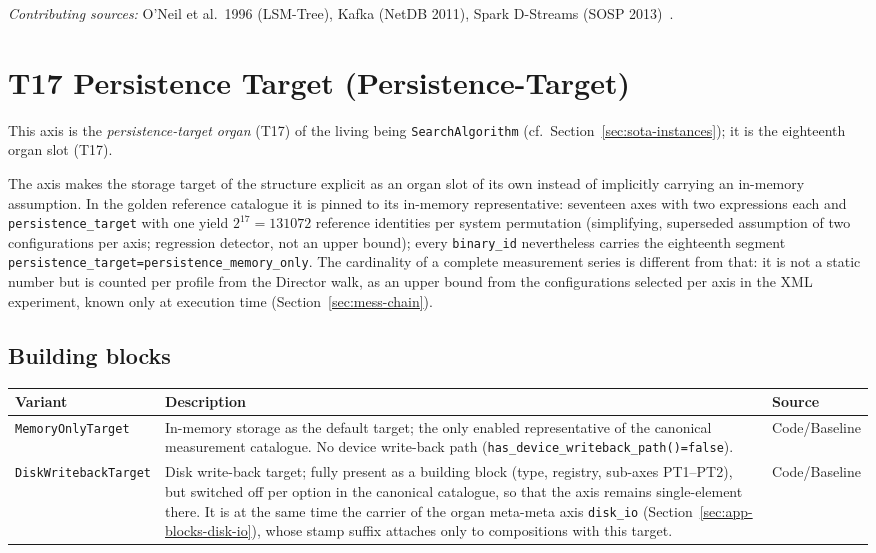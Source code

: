 \emph{Contributing sources:} O'Neil et al.\ 1996 (LSM-Tree), Kafka (Net\allowbreak{}DB 2011), Spark D-Streams (SOSP 2013)~\cite{oneil1996lsm,kreps2011kafka,zaharia2013dstreams}.

\section{T17 Persistence Target (Persistence-Target)}

This axis is the \emph{persistence-target organ} (T17) of the living being \texttt{SearchAlgorithm} (cf.\ Section~\ref{sec:sota-instances}); it is the eighteenth organ slot (T17).

The axis makes the storage target of the structure explicit as an organ slot of its own instead of implicitly carrying an in-memory assumption. In the golden reference catalogue it is pinned to its in-memory representative: seventeen axes with two expressions each and \texttt{persistence\_\allowbreak{}target} with one yield $2^{17} = 131072$ reference identities per system permutation (simplifying, superseded assumption of two configurations per axis; regression detector, not an upper bound); every \texttt{binary\_\allowbreak{}id} nevertheless carries the eighteenth segment \texttt{persistence\_\allowbreak{}target=\allowbreak{}persistence\_\allowbreak{}memory\_\allowbreak{}only}. The cardinality of a complete measurement series is different from that: it is not a static number but is counted per profile from the Director walk, as an upper bound from the configurations selected per axis in the XML experiment, known only at execution time (Section~\ref{sec:mess-chain}).

\subsection*{Building blocks}
\begin{scriptsize}
\begin{longtable}{@{}>{\raggedright\arraybackslash}p{3.0cm} >{\raggedright\arraybackslash}p{8.5cm} >{\raggedright\arraybackslash}p{2.0cm}@{}}
\toprule
Variant & Description & Source \\
\midrule
\endhead%
\texttt{Memory\allowbreak{}Only\allowbreak{}Target} & In-memory storage as the default target; the only enabled representative of the canonical measurement catalogue. No device write-back path (\texttt{has\_\allowbreak{}device\_\allowbreak{}writeback\_\allowbreak{}path()=false}). & Code/\allowbreak{}Baseline \\
\texttt{Disk\allowbreak{}Writeback\allowbreak{}Target} & Disk write-back target; fully present as a building block (type, registry, sub-axes PT1--PT2), but switched off per option in the canonical catalogue, so that the axis remains single-element there. It is at the same time the carrier of the organ meta-meta axis \texttt{disk\_\allowbreak{}io} (Section~\ref{sec:app-blocks-disk-io}), whose stamp suffix attaches only to compositions with this target. & Code/\allowbreak{}Baseline \\
\bottomrule
\end{longtable}
\end{scriptsize}


